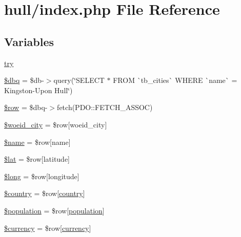 \hypertarget{hull_2index_8php}{}\section{hull/index.php File Reference}
\label{hull_2index_8php}
\subsection*{Variables}
\begin{DoxyCompactItemize}
\item 
\mbox{\hyperlink{hull_2index_8php_abe4cc9788f52e49485473dc699537388}{try}}
\item 
\mbox{\hyperlink{hull_2index_8php_ab76933014035168a37e7e525ca8fbabe}{\$dbq}} = \$db-\/$>$query(\char`\"{}S\+E\+L\+E\+CT $\ast$ F\+R\+OM \`{}tb\+\_\+cities\`{} W\+H\+E\+RE \`{}name\`{} = \textquotesingle{}Kingston-\/Upon Hull\textquotesingle{}\char`\"{})
\item 
\mbox{\hyperlink{hull_2index_8php_aa1d731aa570613e5bcff831bb10e9b87}{\$row}} = \$dbq-\/$>$fetch(P\+D\+O\+::\+F\+E\+T\+C\+H\+\_\+\+A\+S\+S\+OC)
\item 
\mbox{\hyperlink{hull_2index_8php_a34dc977e0c4838f8c2d423849ad9ff02}{\$woeid\+\_\+city}} = \$row\mbox{[}\textquotesingle{}woeid\+\_\+city\textquotesingle{}\mbox{]}
\item 
\mbox{\hyperlink{hull_2index_8php_ab2fc40d43824ea3e1ce5d86dee0d763b}{\$name}} = \$row\mbox{[}\textquotesingle{}name\textquotesingle{}\mbox{]}
\item 
\mbox{\hyperlink{hull_2index_8php_af498b42b83afed4dfe0af05fd802776c}{\$lat}} = \$row\mbox{[}\textquotesingle{}latitude\textquotesingle{}\mbox{]}
\item 
\mbox{\hyperlink{hull_2index_8php_a30223182013e2964ccbd7c134b3c52c1}{\$long}} = \$row\mbox{[}\textquotesingle{}longitude\textquotesingle{}\mbox{]}
\item 
\mbox{\hyperlink{hull_2index_8php_a1437a5f6eb157f0eb267a26e0ad4f1ba}{\$country}} = \$row\mbox{[}\textquotesingle{}\mbox{\hyperlink{index_8php_a0f0752705301c982dc8994ebc993e6e9}{country}}\textquotesingle{}\mbox{]}
\item 
\mbox{\hyperlink{hull_2index_8php_afc1939ed7d0e8629546e2bc27b02dbc1}{\$population}} = \$row\mbox{[}\textquotesingle{}\mbox{\hyperlink{index_8php_aa78fa356925cd3f67d485c4d6846202b}{population}}\textquotesingle{}\mbox{]}
\item 
\mbox{\hyperlink{hull_2index_8php_a37d22fd3b896e9d5488f3479a4d8f451}{\$currency}} = \$row\mbox{[}\textquotesingle{}\mbox{\hyperlink{index_8php_abd84e0698c321abdbf211d5b8425d0b5}{currency}}\textquotesingle{}\mbox{]}

\end{DoxyCompactItemize}
